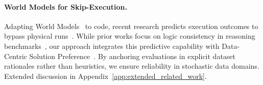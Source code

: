 \paragraph{World Models for Skip-Execution.}
Adapting World Models~\cite{Ding2025, li2025wordworldlargelanguage} to code, recent research predicts execution outcomes to bypass physical runs~\cite{Hora2024predictingtestresultswithoutexecution, faircodegenteam2025cwmopenweightsllmresearch, li2025codeiocondensingreasoningpatterns}.
While prior works focus on logic consistency in reasoning benchmarks~\cite{wei2025equibenchbenchmarkinglargelanguage, gu2024cruxevalbenchmarkcodereasoning, jain2024livecodebenchholisticcontaminationfree}, our approach integrates this predictive capability with Data-Centric Solution Preference~\cite{Shen2024towardsdatacentricrlhf, Just2024datacentrichuman}.
By anchoring evaluations in explicit dataset rationales rather than heuristics, we ensure reliability in stochastic data domains.
Extended discussion in Appendix~\ref{app:extended_related_work}.